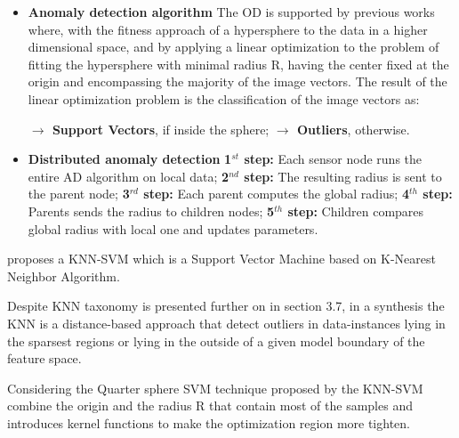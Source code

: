 \begin{itemize}
	\setlength\itemsep{-0.5em}
	\item \textbf{Anomaly detection  algorithm}
	\subitem The OD is supported by previous works where, with the fitness approach of a hypersphere to the data in a higher dimensional space, and by applying a linear optimization to the problem of fitting the hypersphere with minimal radius R, having the center fixed at the origin and encompassing the majority of the image vectors.
	\subitem The result of the linear optimization problem is the classification of the image vectors as:
	
	\vspace{-1em}
	
	\subitem  \textbf{$\rightarrow$ Support Vectors}, if inside the sphere;
	\subitem  \textbf{$\rightarrow$ Outliers}, otherwise.
	\vspace{1em}
	
	\item \textbf{Distributed anomaly detection}
	\subitem \textbf{1$^{st}$ step:} Each sensor node runs the entire AD algorithm on local data;
	\subitem \textbf{2$^{nd}$ step:} The resulting radius is sent to the parent node;
	\subitem \textbf{3$^{rd}$ step:} Each parent computes the global radius;
	\subitem \textbf{4$^{th}$ step:} Parents sends the radius to children nodes;
	\subitem \textbf{5$^{th}$ step:} Children compares global radius with local one and updates parameters.
		
\end{itemize}


\cite{class:xu:2012} proposes a KNN-SVM which is a Support Vector Machine based on K-Nearest Neighbor Algorithm.

Despite KNN taxonomy is presented further on in section 3.7, in a synthesis  the KNN is a distance-based approach that detect outliers in data-instances lying in the sparsest regions or lying in the outside of a given model boundary of the feature space.

Considering the Quarter sphere SVM technique proposed by \cite{class:rajasegarar:2007} the KNN-SVM combine the origin and the radius R that contain most of the samples and introduces kernel functions to make the optimization region more tighten. 

\newpage





